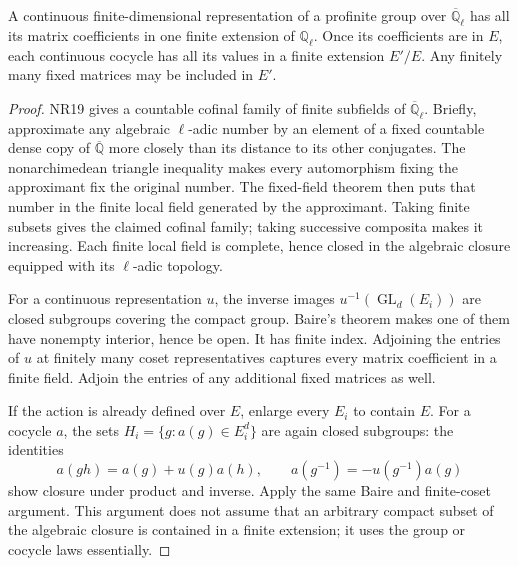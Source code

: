 \begin{lemma}
\label{claim:ADK1}
A continuous finite-dimensional representation of a profinite group
over $\overline{\mathbb Q}_\ell$ has all its matrix coefficients in
one finite extension of $\mathbb Q_\ell$.  Once its coefficients are
in $E$, each continuous cocycle has all its values in a finite
extension $E'/E$.  Any finitely many fixed matrices may be included
in $E'$.
\end{lemma}
\begin{proof}
NR19 gives a countable cofinal family of finite subfields of
$\overline{\mathbb Q}_\ell$.  Briefly, approximate any algebraic
$\ell$-adic number by an element of a fixed countable dense copy of
$\overline{\mathbb Q}$ more closely than its distance to its other
conjugates.  The nonarchimedean triangle inequality makes every
automorphism fixing the approximant fix the original number.  The
fixed-field theorem then puts that number in the finite local field
generated by the approximant.  Taking finite subsets gives the claimed
cofinal family; taking successive composita makes it increasing.
Each finite local field is complete, hence closed in the algebraic
closure equipped with its $\ell$-adic topology.

For a continuous representation $u$, the inverse images
$u^{-1}(\operatorname{GL}_d(E_i))$ are closed subgroups covering the
compact group.  Baire's theorem makes one of them have nonempty
interior, hence be open.  It has finite index.  Adjoining the entries
of $u$ at finitely many coset representatives captures every matrix
coefficient in a finite field.  Adjoin the entries of any additional
fixed matrices as well.

If the action is already defined over $E$, enlarge every $E_i$ to
contain $E$.  For a cocycle $a$, the sets
$H_i=\{g:a(g)\in E_i^d\}$ are again closed subgroups: the identities
\[
 a(gh)=a(g)+u(g)a(h),\qquad
 a(g^{-1})=-u(g^{-1})a(g)
\]
show closure under product and inverse.  Apply the same Baire and
finite-coset argument.  This argument does not assume that an arbitrary
compact subset of the algebraic closure is contained in a finite
extension; it uses the group or cocycle laws essentially.
\end{proof}

